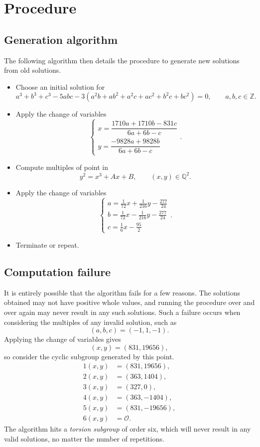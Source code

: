 \documentclass{article}
\newcommand{\rb}[1]{\left( #1 \right)}
\newcommand{\Z}{\mathbb{Z}}
\newcommand{\Q}{\mathbb{Q}}
\newcommand{\OO}{\mathcal{O}}
\begin{document}
\section{Procedure}

\subsection{Generation algorithm}

The following algorithm then details the procedure to generate new solutions from old solutions.
\begin{itemize}
\item Choose an initial solution for
$$ a^3 + b^3 + c^3 - 5abc - 3\rb{a^2b + ab^2 + a^2c + ac^2 + b^2c + bc^2} = 0, \qquad a, b, c \in \Z. $$
\item Apply the change of variables
$$
\begin{cases}
x = \dfrac{1710a + 1710b - 831c}{6a + 6b - c} \\
y = \dfrac{-9828a + 9828b}{6a + 6b - c}
\end{cases}.
$$
\item Compute multiples of point in
$$ y^2 = x^3 + Ax + B, \qquad \rb{x, y} \in \Q^2. $$
\item Apply the change of variables
$$
\begin{cases}
a = \tfrac{1}{72}x + \tfrac{1}{216}y - \tfrac{277}{24} \\
b = \tfrac{1}{72}x - \tfrac{1}{216}y - \tfrac{277}{24} \\
c = \tfrac{1}{6}x - \tfrac{95}{2}
\end{cases}.
$$
\item Terminate or repeat.
\end{itemize}

\subsection{Computation failure}

It is entirely possible that the algorithm fails for a few reasons. The solutions obtained may not have positive whole values, and running the procedure over and over again may never result in any such solutions. Such a failure occurs when considering the multiples of any invalid solution, such as
$$ \rb{a, b, c} = \rb{-1, 1, -1}. $$
Applying the change of variables gives
$$ \rb{x, y} = \rb{831, 19656}, $$
so consider the cyclic subgroup generated by this point.
\begin{align*}
1\rb{x, y} & = \rb{831, 19656}, \\
2\rb{x, y} & = \rb{363, 1404}, \\
3\rb{x, y} & = \rb{327, 0}, \\
4\rb{x, y} & = \rb{363, -1404}, \\
5\rb{x, y} & = \rb{831, -19656}, \\
6\rb{x, y} & = \OO.
\end{align*}
The algorithm hits a \emph{torsion subgroup} of order six, which will never result in any valid solutions, no matter the number of repetitions.
\end{document}
